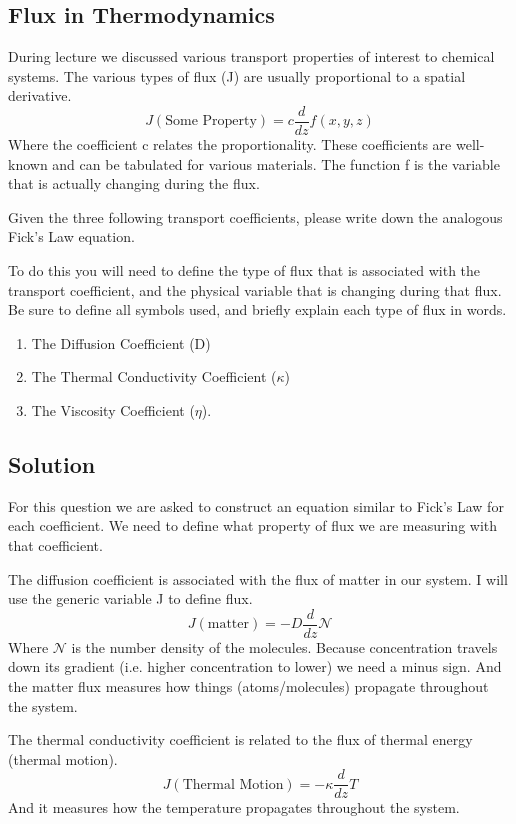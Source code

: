 \documentclass{article}
\newcommand{\be}{\begin{equation}}
\newcommand{\ee}{\end{equation}}
\begin{document}
\subsection*{Flux in Thermodynamics}
During lecture we discussed various transport properties of interest to chemical systems. 
The various types of flux (J) are usually proportional to a spatial derivative.
\be
J(\text{Some Property}) = c\frac{d}{dz}f(x,y,z)
\ee
Where the coefficient c relates the proportionality. 
These coefficients are well-known and can be tabulated for various materials. 
The function f is the variable that is actually changing during the flux.

Given the three following transport coefficients, please write down the analogous Fick's Law equation.

To do this you will need to define the type of flux that is associated with the transport coefficient, and the physical variable that is changing during that flux. 
Be sure to define all symbols used, and briefly explain each type of flux in words.  

\begin{enumerate}
\item The Diffusion Coefficient (D)
\item The Thermal Conductivity Coefficient ($\kappa$)
\item The Viscosity Coefficient ($\eta$).
\end{enumerate}

\subsection*{Solution}
For this question we are asked to construct an equation similar to Fick's Law for each coefficient.
We need to define what property of flux we are measuring with that coefficient. 

The diffusion coefficient is associated with the flux of matter in our system.
I will use the generic variable J to define flux.
\be
J(\text{matter}) = -D \frac{d}{dz} \mathcal{N}
\ee
Where $\mathcal{N}$ is the number density of the molecules. 
Because concentration travels down its  gradient (i.e. higher concentration to lower) we need a minus sign. 
And the matter flux measures how things (atoms/molecules) propagate throughout the system. 

The thermal conductivity coefficient is  related  to the flux of thermal energy (thermal motion). 
\be
J(\text{Thermal Motion}) = -\kappa \frac{d}{dz} T
\ee
And it measures how the temperature propagates throughout the system. 
\end{document}
